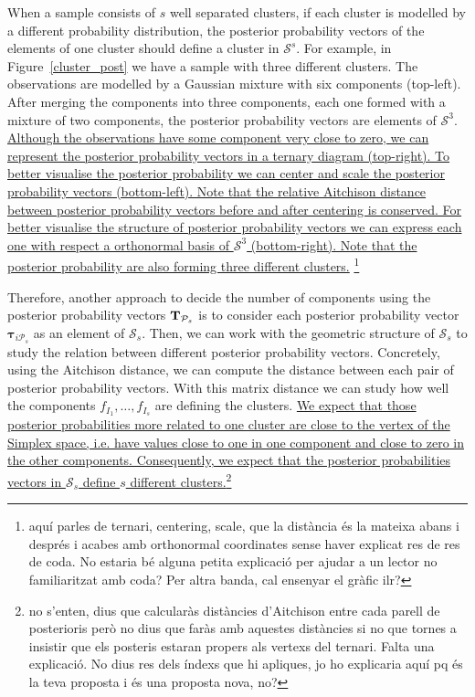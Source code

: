 \documentclass[submit]{smj}
\theoremstyle{definition}
\newcommand{\m}[1]{\boldsymbol{#1}}
\begin{document}
When a sample consists of $s$ well separated clusters, if each cluster is modelled by a different probability distribution, the posterior probability vectors of the elements of one cluster should define a cluster in $\mathcal{S}^s$. For example, in Figure~\ref{cluster_post} we have a sample with three different clusters. The observations are modelled by a Gaussian mixture with six components (top-left). After merging the components into three components, each one formed with a mixture of two components, the posterior probability vectors are elements of $\mathcal{S}^3$. \ul{Although the observations have some component very close to zero, we can represent the posterior probability vectors in a ternary diagram (top-right). To better visualise the posterior probability we can center and scale the posterior probability vectors (bottom-left). Note that the relative Aitchison distance between posterior probability vectors before and after centering is conserved. For better visualise the structure of posterior probability vectors we can express each one with respect a orthonormal basis of $\mathcal{S}^3$ (bottom-right). Note that the posterior probability are also forming three different clusters.} \footnote{aquí parles de ternari, centering, scale, que la distància és la mateixa abans i després i acabes amb orthonormal coordinates sense haver explicat res de res de coda. No estaria bé alguna petita explicació per ajudar a un lector no familiaritzat amb coda? Per altra banda, cal ensenyar el gràfic ilr?}


Therefore, another approach to decide the number of components using the posterior probability vectors $\text{\textbf{T}}_{\mathcal{P}_s}$ is to consider each posterior probability vector $\m\tau_{i\mathcal{P}_s}$ as an element of $\mathcal{S}_s$. Then, we can work with the geometric structure of $\mathcal{S}_s$ to study the relation between different posterior probability vectors. Concretely, using the Aitchison distance, we can compute the distance between each pair of posterior probability vectors. With this matrix distance we can study how well the components $f_{I_1}, \dots, f_{I_s}$ are defining the clusters. \ul{ We expect that those posterior probabilities more related to one cluster are close to the vertex of the Simplex space, i.e. have values close to one in one component and close to zero in the other components. Consequently, we expect that the posterior probabilities vectors in $\mathcal{S}_s$ define $s$ different clusters.}\footnote{no s'enten, dius que calcularàs distàncies d'Aitchison entre cada parell de posterioris però no dius que faràs amb aquestes distàncies si no que tornes a insistir que els posteris estaran propers als vertexs del ternari. Falta una explicació. No dius res dels índexs que hi apliques, jo ho explicaria aquí pq és la teva proposta i és una proposta nova, no?}
\end{document}
